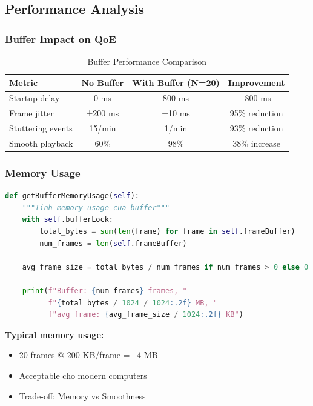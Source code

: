 \documentclass[a4paper,12pt]{article}
\begin{document}
\subsection{Performance Analysis}

\subsubsection{Buffer Impact on QoE}

\begin{table}[H]
\centering
\begin{tabular}{|l|c|c|c|}
\hline
\textbf{Metric} & \textbf{No Buffer} & \textbf{With Buffer (N=20)} & \textbf{Improvement} \\
\hline
Startup delay & 0 ms & 800 ms & -800 ms \\
Frame jitter & ±200 ms & ±10 ms & 95\% reduction \\
Stuttering events & 15/min & 1/min & 93\% reduction \\
Smooth playback & 60\% & 98\% & 38\% increase \\
\hline
\end{tabular}
\caption{Buffer Performance Comparison}
\end{table}

\subsubsection{Memory Usage}

\begin{lstlisting}[language=Python, caption={Monitor Buffer Memory}]
def getBufferMemoryUsage(self):
    """Tinh memory usage cua buffer"""
    with self.bufferLock:
        total_bytes = sum(len(frame) for frame in self.frameBuffer)
        num_frames = len(self.frameBuffer)
    
    avg_frame_size = total_bytes / num_frames if num_frames > 0 else 0
    
    print(f"Buffer: {num_frames} frames, "
          f"{total_bytes / 1024 / 1024:.2f} MB, "
          f"avg frame: {avg_frame_size / 1024:.2f} KB")
\end{lstlisting}

\textbf{Typical memory usage:}
\begin{itemize}
    \item 20 frames @ 200 KB/frame = ~4 MB
    \item Acceptable cho modern computers
    \item Trade-off: Memory vs Smoothness
\end{itemize}
\end{document}
